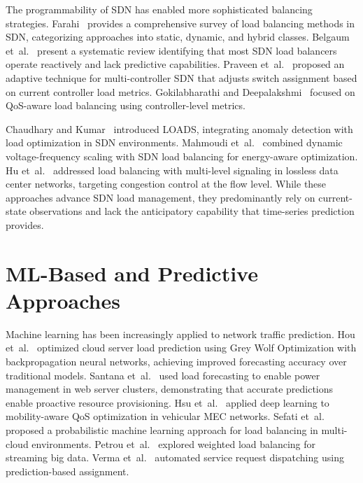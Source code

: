 \documentclass[12pt,a4paper]{report}
\begin{document}
The programmability of SDN has enabled more sophisticated balancing strategies. Farahi~\cite{farahi2025comprehensive} provides a comprehensive survey of load balancing methods in SDN, categorizing approaches into static, dynamic, and hybrid classes. Belgaum et~al.~\cite{belgaum2020systematic} present a systematic review identifying that most SDN load balancers operate reactively and lack predictive capabilities. Praveen et~al.~\cite{praveen2022adaptive} proposed an adaptive technique for multi-controller SDN that adjusts switch assignment based on current controller load metrics. Gokilabharathi and Deepalakshmi~\cite{gokilabharathi2018efficient} focused on QoS-aware load balancing using controller-level metrics.

Chaudhary and Kumar~\cite{chaudhary2019loads} introduced LOADS, integrating anomaly detection with load optimization in SDN environments. Mahmoudi et~al.~\cite{mahmoudi2022sdn} combined dynamic voltage-frequency scaling with SDN load balancing for energy-aware optimization. Hu et~al.~\cite{hu2024load} addressed load balancing with multi-level signaling in lossless data center networks, targeting congestion control at the flow level. While these approaches advance SDN load management, they predominantly rely on current-state observations and lack the anticipatory capability that time-series prediction provides.

\section{ML-Based and Predictive Approaches}

Machine learning has been increasingly applied to network traffic prediction. Hou et~al.~\cite{hou2021research} optimized cloud server load prediction using Grey Wolf Optimization with backpropagation neural networks, achieving improved forecasting accuracy over traditional models. Santana et~al.~\cite{santana2011power} used load forecasting to enable power management in web server clusters, demonstrating that accurate predictions enable proactive resource provisioning. Hsu et~al.~\cite{hsu2021mobility} applied deep learning to mobility-aware QoS optimization in vehicular MEC networks. Sefati et~al.~\cite{sefati2025probabilistic} proposed a probabilistic machine learning approach for load balancing in multi-cloud environments. Petrou et~al.~\cite{petrou2021weighted} explored weighted load balancing for streaming big data. Verma et~al.~\cite{verma2011automated} automated service request dispatching using prediction-based assignment.
\end{document}
